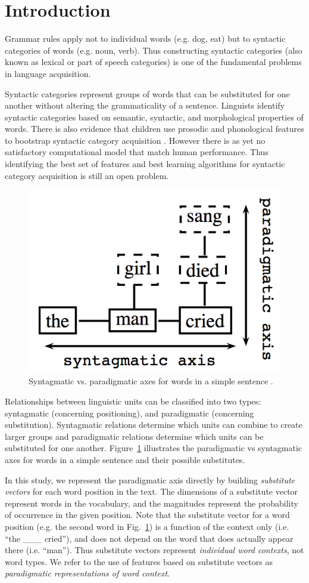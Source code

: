 \section{Introduction}
\label{sec:intro}

Grammar rules apply not to individual words (e.g. dog, eat) but to
syntactic categories of words (e.g. noun, verb).  Thus constructing
syntactic categories (also known as lexical or part of speech
categories) is one of the fundamental problems in language
acquisition.

Syntactic categories represent groups of words that can be substituted
for one another without altering the grammaticality of a sentence.
Linguists identify syntactic categories based on semantic, syntactic,
and morphological properties of words.  There is also evidence that
children use prosodic and phonological features to bootstrap syntactic
category acquisition \cite{ambridge2011child}.  However there is as
yet no satisfactory computational model that match human performance.
Thus identifying the best set of features and best learning algorithms
for syntactic category acquisition is still an open problem.

\begin{figure}[t] 
  \centering
  \includegraphics[height=0.3\textwidth]{paradigmatic.png}
  \caption{Syntagmatic vs. paradigmatic axes for words in a simple
    sentence \protect\cite{chandler2007semiotics}.}
  \label{fig:paradigmatic}
\end{figure}

Relationships between linguistic units can be classified into two
types: syntagmatic (concerning positioning), and paradigmatic
(concerning substitution).  Syntagmatic relations determine which
units can combine to create larger groups and paradigmatic relations
determine which units can be substituted for one another.
Figure~\ref{fig:paradigmatic} illustrates the paradigmatic vs
syntagmatic axes for words in a simple sentence and their possible
substitutes.  

In this study, we represent the paradigmatic axis directly by building
{\em substitute vectors} for each word position in the text.  The
dimensions of a substitute vector represent words in the vocabulary,
and the magnitudes represent the probability of occurrence in the given
position.  Note that the substitute vector for a word position (e.g.
the second word in Fig.~\ref{fig:paradigmatic}) is a function of the
context only (i.e. ``the \_\_\_ cried''), and does not depend on the
word that does actually appear there (i.e. ``man'').  Thus substitute
vectors represent {\em individual word contexts}, not word types.  We
refer to the use of features based on substitute vectors as 
{\em paradigmatic representations of word context}.

